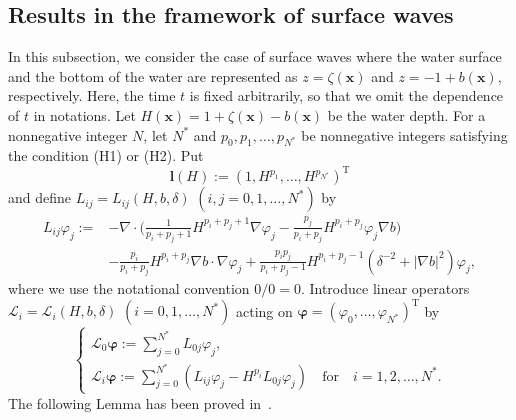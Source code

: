 \documentclass[11pt,leqno]{article}
\numberwithin{equation}{section}
\numberwithin{figure}{section}
\begin{document}
\subsection{Results in the framework of surface waves}\label{S.cons:one-layer}
%
In this subsection, we consider the case of surface waves where the water surface and the bottom of the 
water are represented as $z=\zeta(\bm{x})$ and $z=-1+b(\bm{x})$, respectively. 
Here, the time $t$ is fixed arbitrarily, so that we omit the dependence of $t$ in notations. 
Let $H(\bm{x})=1+\zeta(\bm{x})-b(\bm{x})$ be the water depth. 
For a nonnegative integer $N$, let $N^*$ and $p_0,p_1,\ldots,p_{N^*}$ be nonnegative integers 
satisfying the condition (H1) or (H2). 
Put 
% 
\begin{equation}\label{def-l}
{\bm l}(H) := (1,H^{p_1},\dots,H^{p_{N^*}})^\mathrm{T}
\end{equation}
%
and define $L_{ij} = L_{ij}(H,b,\delta)$ $(i,j=0,1,\ldots,N^*)$ by 
%
\begin{align}\label{def-Lij}
L_{ij}\varphi_{j}
:=& - \nabla\cdot\biggl(
   \frac{1}{p_i+p_j+1}H^{p_i+p_j+1}\nabla\varphi_{j}
   - \frac{p_j}{p_i+p_j}H^{p_i+p_j}\varphi_{j}\nabla b\biggr) \\
 &- \frac{p_i}{p_i+p_j}H^{p_i+p_j}\nabla b\cdot\nabla\varphi_{j}
   + \frac{p_ip_j}{p_i+p_j-1}H^{p_i+p_j-1}(\delta^{-2}+ |\nabla b|^2)\varphi_{j}, \nonumber
\end{align}
where we use the notational convention $0/0 = 0$.
%
Introduce linear operators $\mathcal{L}_{i} = \mathcal{L}_{i}(H,b,\delta)$ $(i=0,1,\ldots,N^*)$ 
acting on ${\bm \varphi} = (\varphi_{0},\ldots,\varphi_{N^*})^\mathrm{T}$ by 
%
\begin{equation}\label{def-L}
\begin{cases}
 \displaystyle
  \mathcal{L}_{0} {\bm \varphi} := \sum_{j=0}^{N^*} L_{0j} \varphi_{j}, \\
 \displaystyle
  \mathcal{L}_{i} {\bm \varphi} := \sum_{j=0}^{N^*} ( L_{ij}\varphi_{j} - H^{p_i}L_{0j}\varphi_{j} )
   \quad\mbox{for}\quad i=1,2,\ldots,N^*.
\end{cases}
\end{equation}
%
The following Lemma has been proved in~\cite[Lemmas 3.2 and 3.4]{Iguchi2018-2}. 
\end{document}
